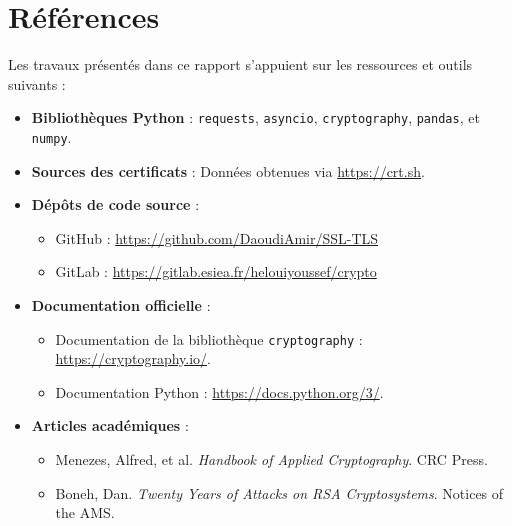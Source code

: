 \documentclass[11pt,a4paper]{article}
\begin{document}
\section*{Références}
Les travaux présentés dans ce rapport s'appuient sur les ressources et outils suivants :
\begin{itemize}
    \item \textbf{Bibliothèques Python} : \texttt{requests}, \texttt{asyncio}, \texttt{cryptography}, \texttt{pandas}, et \texttt{numpy}.
    \item \textbf{Sources des certificats} : Données obtenues via \url{https://crt.sh}.
    \item \textbf{Dépôts de code source} : 
    \begin{itemize}
        \item GitHub : \url{https://github.com/DaoudiAmir/SSL-TLS}
        \item GitLab : \url{https://gitlab.esiea.fr/helouiyoussef/crypto}
    \end{itemize}
    \item \textbf{Documentation officielle} :
    \begin{itemize}
        \item Documentation de la bibliothèque \texttt{cryptography} : \url{https://cryptography.io/}.
        \item Documentation Python : \url{https://docs.python.org/3/}.
    \end{itemize}
    \item \textbf{Articles académiques} :
    \begin{itemize}
        \item Menezes, Alfred, et al. \textit{Handbook of Applied Cryptography}. CRC Press.
        \item Boneh, Dan. \textit{Twenty Years of Attacks on RSA Cryptosystems}. Notices of the AMS.
    \end{itemize}
\end{itemize}
\end{document}
